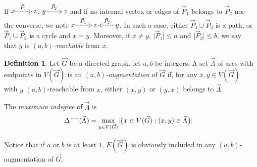 \documentclass[a4paper]{amsart}
\makeatletter
\theoremstyle{definition}
\newtheorem{definition}{Definition}[section]
\theoremstyle{remark}
\newcommand{\card}[1]{\lvert{#1}\rvert}
\DeclareMathOperator\md{\Delta^{\rm --}}
\def\vG{\vec{G}}
\def\vP{\vec{P}}
\def\vL{\vec{\Lambda}}
\newcommand{\rdpath}[1]{\xy\xymatrix{*!{}\ar@{~2>}[r]^{#1}&*!{}}\endxy}
\newcommand{\ldpath}[1]{\xy\xymatrix{*!{}&*!{}\ar@{~2>}[l]_{#1}}\endxy}
\newcommand{\dpath}[3]{{#1}\rdpath{#2}{#3}}
\newcommand{\lambd}[5]{{#1}\rdpath{#2}{#3}\ldpath{#4}{#5}}
\makeatother
\begin{document}
If $\dpath{x}{\vP_1}{z}$, $\dpath{y}{\vP_2}{z}$ and if 
no internal vertex or edges of $\vP_1$ belongs to $\vP_2$ nor the
converse, we note $\lambd{x}{\vP_1}{z}{\vP_2}{y}$. In such a case,
either $\vP_1\cup\vP_2$ is a path, or  $\vP_1\cup\vP_2$ is a cycle and
$x=y$. Moreover, if $x\neq y$, $\card{\vP_1}\leq a$ and
$\card{\vP_2}\leq b$, we say that $y$ is {\em $(a,b)$-reachable} from
$x$. 
\begin{definition}
Let $\vG$ be a directed graph, let $a,b$ be integers.
A set $\vL$ of arcs with endpoints in $V(\vG)$ is an 
{\em $(a,b)$-augmentation} of $\vG$ if, for any $x,y\in V(\vG)$
with $y$ $(a,b)$-reachable from $x$, either $(x,y)$ or $(y,x)$ belongs
to $\vL$.

The {\em maximum indegree} of $\vL$ is
\begin{equation*}
  \md(\vL)=\max_{y\in V(\vG)}\card{\{x\in V(\vG):
    (x,y)\in\vL\}}
\end{equation*}
\end{definition}

Notice that if $a$ or $b$ is at least $1$, $E(\vG)$ is obviously included in any
$(a,b)$-augmentation of $\vG$.
\end{document}
